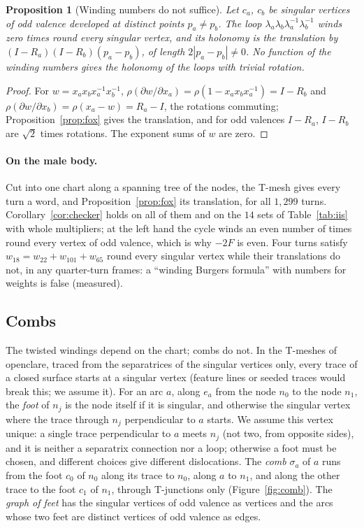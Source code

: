 \documentclass[11pt,a4paper]{article}
\newtheorem{proposition}{Proposition}
\begin{document}
\begin{proposition}[Winding numbers do not suffice]\label{prop:commutator}
Let $c_a$, $c_b$ be singular vertices of odd valence developed at distinct
points $p_a \neq p_b$. The loop $\lambda_a \lambda_b \lambda_a^{-1}
\lambda_b^{-1}$ winds zero times round every singular vertex, and its holonomy
is the translation by $(I - R_a)(I - R_b)(p_a - p_b)$, of length $2|p_a - p_b|
\neq 0$. No function of the winding numbers gives the holonomy of the loops
with trivial rotation.
\end{proposition}

\begin{proof}
For $w = x_a x_b x_a^{-1} x_b^{-1}$, $\rho(\partial w/\partial x_a) = \rho(1 -
x_a x_b x_a^{-1}) = I - R_b$ and $\rho(\partial w/\partial x_b) = \rho(x_a -
w) = R_a - I$, the rotations commuting; Proposition~\ref{prop:fox} gives the
translation, and for odd valences $I - R_a$, $I - R_b$ are $\sqrt2$ times
rotations. The exponent sums of $w$ are zero.
\end{proof}

\paragraph{On the male body.}
Cut into one chart along a spanning tree of the nodes, the T-mesh gives every
turn a word, and Proposition~\ref{prop:fox} its translation, for all
$1{,}299$ turns. Corollary~\ref{cor:checker} holds on all of them and on the
$14$ sets of Table~\ref{tab:iis} with whole multipliers; at the left hand the
cycle winds an even number of times round every vertex of odd valence, which
is why $-2F$ is even. Four turns satisfy $w_{18} = w_{22} + w_{101} + w_{65}$
round every singular vertex while their translations do not, in any
quarter-turn frames: a ``winding Burgers formula'' with numbers for weights is
false (measured).

\subsection{Combs}\label{sec:combs}

The twisted windings depend on the chart; combs do not. In the T-meshes of
openclare, traced from the separatrices of the singular vertices only, every
trace of a closed surface starts at a singular vertex (feature lines or seeded
traces would break this; we assume it). For an arc $a$, along $e_a$ from the node $n_0$
to the node $n_1$, the \emph{foot} of $n_j$ is the node itself if it is
singular, and otherwise the singular vertex where the trace through $n_j$
perpendicular to $a$ starts. We assume this vertex unique: a single trace
perpendicular to $a$ meets $n_j$ (not two, from opposite sides), and it is neither a separatrix
connection nor a loop; otherwise a foot must be chosen, and different choices
give different dislocations. The \emph{comb} $\sigma_a$ of $a$ runs from the
foot $c_0$ of $n_0$ along its trace to $n_0$, along $a$ to $n_1$, and along the
other trace to the foot $c_1$ of $n_1$, through T-junctions only
(Figure~\ref{fig:comb}). The \emph{graph of feet} has the singular vertices of
odd valence as vertices and the arcs whose two feet are distinct vertices of
odd valence as edges.
\end{document}
